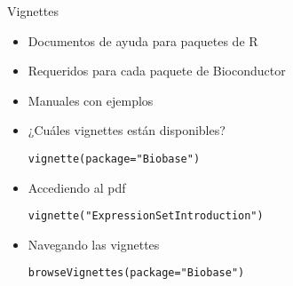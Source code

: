 \documentclass{beamer}
\begin{document}
\begin{frame}[fragile]{Vignettes}
\begin{itemize}
\item Documentos de ayuda para paquetes de R
\item Requeridos para cada paquete de Bioconductor
\item Manuales con ejemplos
\item ¿Cuáles vignettes están disponibles?
\begin{verbatim}
vignette(package="Biobase")
\end{verbatim}
\item Accediendo al pdf
\begin{verbatim}
vignette("ExpressionSetIntroduction")
\end{verbatim}
\item Navegando las vignettes
\begin{verbatim}
browseVignettes(package="Biobase")
\end{verbatim}
\end{itemize}
\end{frame}




%
%
%
%
%
\end{document}
